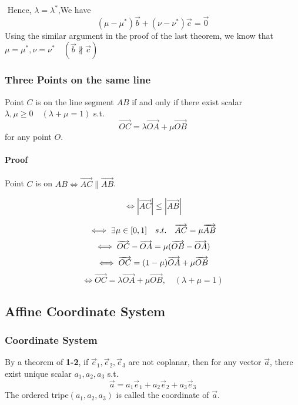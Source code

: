 \documentclass[UTF8]{ctexart}
\begin{document}
  ​				Hence, $\lambda = \lambda ^*$,We have 
  $$
  (\mu - \mu ^*)\vec b + (\nu - \nu ^*)\vec c = \vec 0 
  $$
  ​				Using the similar argument in the proof of the last theorem, we know that  $\mu = \mu ^*,\nu = \nu ^*\quad (\vec b \not \parallel \vec c)$

  

\subsubsection{Three Points on the same line}

  Point $C$ is on the line segment  $AB$ if and only if there exist scalar $\lambda ,\mu \geq 0 \quad (\lambda + \mu = 1)$ s.t. 
$$
  \overrightarrow{OC} = \lambda \overrightarrow{OA} + \mu \overrightarrow{OB}
$$
   for any point $O$.

  
\paragraph{Proof}

  Point $C$ is on $AB\iff\overrightarrow{AC}\parallel \overrightarrow{AB}$.
 
$$
  \iff |\overrightarrow{AC}|\leq |\overrightarrow{AB}| 
 $$
 
 $$
  \iff \exists \mu \in [0,1]  \quad s.t. \quad  \overrightarrow{AC}= \mu \overrightarrow{AB} \\
  $$
  $$
  \iff \overrightarrow {OC}-\overrightarrow {OA} = \mu (\overrightarrow{OB}- \overrightarrow{OA}) \\
  $$
  $$
  \iff \overrightarrow{OC} = (1-\mu)\overrightarrow{OA}+\mu \overrightarrow{OB}\\
  $$
  $$
  \iff \overrightarrow{OC} = \lambda \overrightarrow{OA}+ \mu \overrightarrow{OB},\quad (\lambda + \mu  = 1)
$$

  


\subsection{Affine Coordinate System}

\subsubsection{ Coordinate System }

  By a theorem of \textbf{1-2}, if $\vec e_1,\vec e_2,\vec e_3$ are not coplanar, then for any vector $\vec a$, there exist unique scalar $a_1,a_2,a_3$ s.t.
$$
  \vec a  = a_1 \vec e_1+ a_2 \vec e_2 + a_3\vec e_3
$$
  The ordered tripe$(a_1,a_2,a_3)$ is called the coordinate of $\vec a $.
\end{document}
